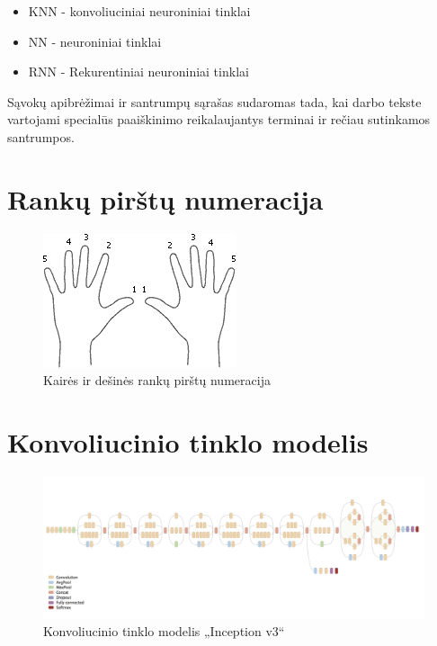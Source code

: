\documentclass{VUMIFPSbakalaurinis}
\begin{document}
\begin{itemize}
	\item KNN - konvoliuciniai neuroniniai tinklai
	\item NN - neuroniniai tinklai
	\item RNN - Rekurentiniai neuroniniai tinklai
	
\end{itemize}

Sąvokų apibrėžimai ir santrumpų sąrašas sudaromas tada, kai darbo tekste
vartojami specialūs paaiškinimo reikalaujantys terminai ir rečiau sutinkamos
santrumpos.

\appendix  %

\section{Rankų pirštų numeracija}
\label{appendix:pirstai}
\begin{figure}[H]
    \centering
    \includegraphics[scale=1]{img/fingers}
    \caption{Kairės ir dešinės rankų pirštų numeracija}
    \label{img:fingers}
\end{figure}

\section{Konvoliucinio tinklo modelis}
\label{appendix:inception_v3}
\begin{figure}[H]
	\centering
	\includegraphics[scale=0.2]{img/inception_v3}
	\caption{Konvoliucinio tinklo modelis „Inception v3“}
	\label{img:inception_v3}
\end{figure}
\end{document}
